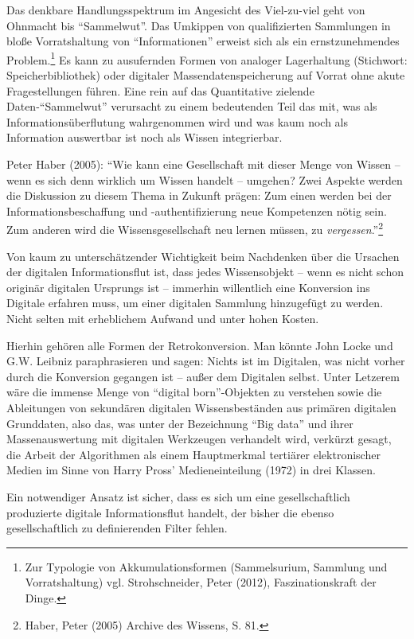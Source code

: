 \documentclass[a4paper,
fontsize=11pt,
oneside,
numbers=noperiodatend,
parskip=half-,
bibliography=totoc,
final
]{scrartcl}
\begin{document}
Das denkbare Handlungsspektrum im Angesicht des Viel-zu-viel geht von
Ohnmacht bis \enquote{Sammelwut}. Das Umkippen von qualifizierten
Sammlungen in bloße Vorratshaltung von \enquote{Informationen} erweist
sich als ein ernstzunehmendes Problem.\footnote{Zur Typologie von
  Akkumulationsformen (Sammelsurium, Sammlung und Vorratshaltung) vgl.
  Strohschneider, Peter (2012), Faszinationskraft der Dinge.} Es kann zu
ausufernden Formen von analoger Lagerhaltung (Stichwort:
Speicherbibliothek) oder digitaler Massendatenspeicherung auf Vorrat
ohne akute Fragestellungen führen. Eine rein auf das Quantitative
zielende Daten-\enquote{Sammelwut} verursacht zu einem bedeutenden Teil
das mit, was als Informationsüberflutung wahrgenommen wird und was kaum
noch als Information auswertbar ist noch als Wissen integrierbar.

Peter Haber (2005): \enquote{Wie kann eine Gesellschaft mit dieser Menge
von Wissen -- wenn es sich denn wirklich um Wissen handelt -- umgehen?
Zwei Aspekte werden die Diskussion zu diesem Thema in Zukunft prägen:
Zum einen werden bei der Informationsbeschaffung und -au\-then\-ti\-fi\-zierung
neue Kompetenzen nötig sein. Zum anderen wird die Wissensgesellschaft
neu lernen müssen, zu \emph{vergessen}.}\footnote{Haber, Peter (2005)
  Archive des Wissens, S. 81.}

Von kaum zu unterschätzender Wichtigkeit beim Nachdenken über die
Ursachen der digitalen Informationsflut ist, dass jedes Wissensobjekt --
wenn es nicht schon originär digitalen Ursprungs ist -- immerhin
willentlich eine Konversion ins Digitale erfahren muss, um einer
digitalen Sammlung hinzugefügt zu werden. Nicht selten mit erheblichem
Aufwand und unter hohen Kosten.

Hierhin gehören alle Formen der Retrokonversion. Man könnte John Locke
und G.W. Leibniz paraphrasieren und sagen: Nichts ist im Digitalen, was
nicht vorher durch die Konversion gegangen ist -- außer dem Digitalen
selbst. Unter Letzerem wäre die immense Menge von \enquote{digital
born}-Objekten zu verstehen sowie die Ableitungen von sekundären
digitalen Wissensbeständen aus primären digitalen Grunddaten, also das,
was unter der Bezeichnung \enquote{Big data} und ihrer Massenauswertung
mit digitalen Werkzeugen verhandelt wird, verkürzt gesagt, die Arbeit
der Algorithmen als einem Hauptmerkmal tertiärer elektronischer Medien
im Sinne von Harry Pross' Medieneinteilung (1972) in drei Klassen.

Ein notwendiger Ansatz ist sicher, dass es sich um eine gesellschaftlich
produzierte digitale Informationsflut handelt, der bisher die ebenso
gesellschaftlich zu definierenden Filter fehlen.
\end{document}
